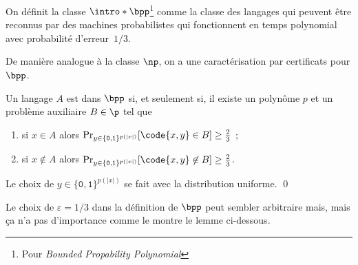 \documentclass[./main]{subfiles}
\begin{document}
  \begin{defn}
    On définit la classe $\intro*\bpp$\footnote{Pour \textit{Bounded Propability Polynomial}} comme la classe des langages qui peuvent être reconnus par des machines probabilistes qui fonctionnent en temps polynomial avec probabilité d'erreur~$1 / 3$.
  \end{defn}

  De manière analogue à la classe $\np$, on a une caractérisation par certificats pour $\bpp$.

  \begin{prop}
    Un langage $A$ est dans $\bpp$ si, et seulement si, il existe un polynôme $p$ et un problème auxiliaire $B \in \p$ tel que
    \begin{enumerate}
      \item si $x \in A$ alors $\Pr_{y \in \{\texttt{0},\texttt{1}\}^{p(|x|)}}[\code{x,y} \in B] \ge \frac{2}{3}$ ;
      \item si $x \not\in A$ alors $\Pr_{y \in \{\texttt{0},\texttt{1}\}^{p(|x|)}}[\code{x,y} \not\in B] \ge \frac{2}{3}$.
    \end{enumerate}
    Le choix de $y \in \{\texttt{0}, \texttt{1}\}^{p(|x|)}$ se fait avec la distribution uniforme.
    \qed
  \end{prop}
  
  Le choix de $\varepsilon = 1/3$ dans la définition de $\bpp$ peut sembler arbitraire mais, mais ça n'a pas d'importance comme le montre le lemme ci-dessous.
\end{document}
